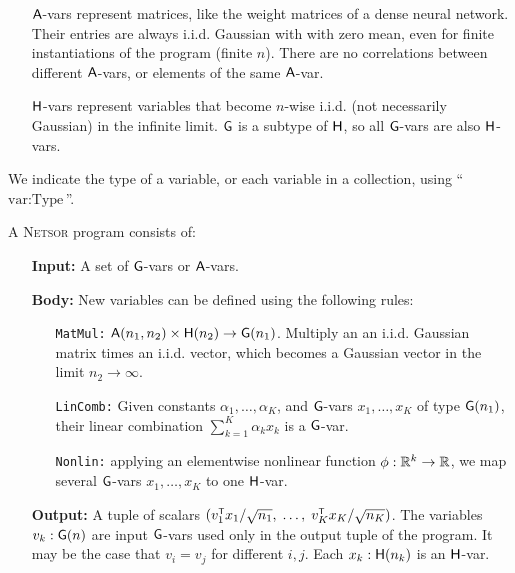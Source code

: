 {\begin{itemize}
\item[$\mathsf{A}$-vars] represent matrices,
like the weight matrices of a dense neural network. Their entries are always i.i.d.
Gaussian with with zero mean, even for finite instantiations of the program
(finite $n$).
There are no correlations between different $\mathsf{A}$-vars, or elements of the same $\mathsf{A}$-var.

\item[$\mathsf{H}$-vars] represent variables that become $n$-wise i.i.d. (not necessarily
Gaussian) in the
infinite limit. $\mathsf{G}$ is a subtype of $\mathsf{H}$, so all $\mathsf{G}$-vars are also $\mathsf{H}$-vars.
\end{itemize}

We indicate the type of a variable, or each variable in a
collection, using ``$\text{var} : \text{Type}$''.


\begin{definition}
A \textsc{Netsor} program consists of:
\begin{itemize}
  \item[\bf Input:]
 A set of $\mathsf{G}$-vars or $\mathsf{A}$-vars.

 \item[\bf Body:]
New variables can be defined using the following rules:
\begin{enumerate}
  \item[\texttt{MatMul:}] $\mathsf{A}(n_1, n_2) \times \mathsf{H}(n_2) \to \mathsf{G}(n_1)$. Multiply an
    an i.i.d. Gaussian matrix times an i.i.d. vector, which becomes a Gaussian
    vector in the limit $n_2 \to \infty$.
  \item[\texttt{LinComb:}] Given constants $\alpha_1,\dots,\alpha_K$, and $\mathsf{G}$-vars
    $x_1,\dots,x_K$ of type $\mathsf{G}(n_1)$, their linear combination $\sum_{k=1}^K \alpha_k
    x_k$ is a $\mathsf{G}$-var.
  \item[\texttt{Nonlin:}] applying an elementwise nonlinear function $\phi : \mathbb{R}^k \to
    \mathbb{R}$, we map
    several $\mathsf{G}$-vars $x_1,\dots,x_K$ to one $\mathsf{H}$-var. 
\end{enumerate}

\item[\bf Output:]
A tuple of scalars $(v_1^\tp x_1/\sqrt{n_1}, \;\dots, \; v_K^\tp
x_K/\sqrt{n_K})$. The variables $v_k : \mathsf{G}(n)$ are input $\mathsf{G}$-vars used only
in the output tuple of the program. It may be the case that $v_i = v_j$ for
different $i, j$. Each $x_k : \mathsf{H}(n_k)$ is an $\mathsf{H}$-var.
\end{itemize}
\end{definition}

}
